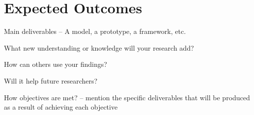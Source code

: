 \section{Expected Outcomes}

Main deliverables – A model, a prototype, a framework, etc.

What new understanding or knowledge will your research add?

How can others use your findings?

Will it help future researchers?

How objectives are met? – mention the specific deliverables that will be produced as a result of achieving each objective

